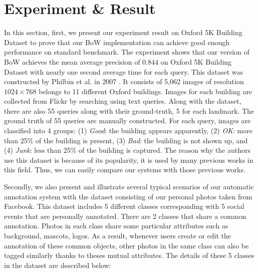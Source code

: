 \section{Experiment \& Result} \label{section:experiment_result}

In this section, first, we present our experiment result on Oxford 5K Building Dataset to prove that our BoW implementation can achieve good enough performance on standard benchmark. The experiment shows that our version of BoW achieves the mean average precision of 0.844 on Oxford 5K Building Dataset with nearly one second average time for each query. This dataset was constructed by Philbin et al. in 2007 \cite{2}. It consists of 5,062 images of resolution $1024 \times 768$ belongs to 11 different Oxford buildings. Images for each building are collected from Flickr by searching using text queries. Along with the dataset, there are also 55 queries along with their ground-truth, 5 for each landmark. The ground truth of 55 queries are manually constructed. For each query, images are classified into 4 groups: (1) \textit{Good}: the building appears apparently, (2) \textit{OK}: more than 25\% of the building is present, (3) \textit{Bad}: the building is not shown up, and (4) \textit{Junk}: less than 25\% of the building is captured. The reason why the authors use this dataset is because of its popularity, it is used by many previous works in this field. Thus, we can easily compare our systems with those previous works.

Secondly, we also present and illustrate several typical scenarios of our automatic annotation system with the dataset consisting of our personal photos taken from Facebook. This dataset includes 5 different classes corresponding with 5 social events that are personally annotated. There are 2 classes that share a common annotation. Photos in each class share some particular attributes such as background, mascots, logos. As a result, whenever users create or edit the annotation of these common objects, other photos in the same class can also be tagged similarly thanks to theses mutual attributes. The details of these 5 classes in the dataset are described below:


